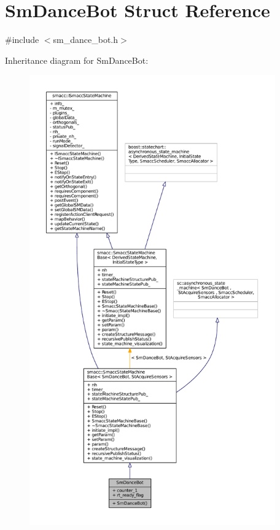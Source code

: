 \hypertarget{structSmDanceBot}{}\section{Sm\+Dance\+Bot Struct Reference}
\label{structSmDanceBot}


{\ttfamily \#include $<$sm\+\_\+dance\+\_\+bot.\+h$>$}



Inheritance diagram for Sm\+Dance\+Bot\+:
\nopagebreak
\begin{figure}[H]
\begin{center}
\leavevmode
\includegraphics[height=550pt]{structSmDanceBot__inherit__graph}
\end{center}
\end{figure}


